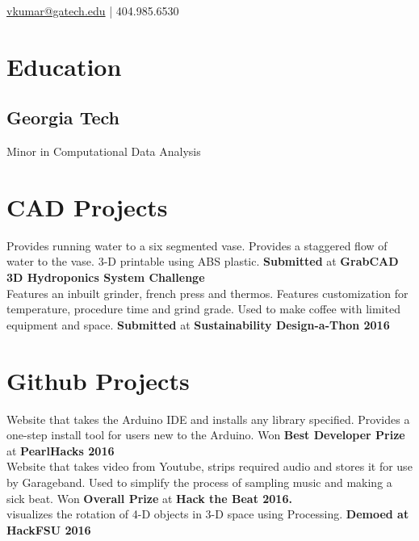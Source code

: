 \documentclass[a4paper]{deedy-resume}
\begin{document}

\href{vkumar@gatech.edu}{vkumar@gatech.edu} | 404.985.6530  

\begin{minipage}[t]{0.35\textwidth} 

\section{Education} 
\subsection{Georgia Tech}
Minor in Computational Data Analysis
\sectionspace 
\section{CAD Projects} 
    Provides running water to a six segmented vase. Provides a staggered flow of water to the vase. 3-D printable using ABS plastic. {\bf Submitted} at {\bf GrabCAD 3D Hydroponics System Challenge}\\ 
   Features an inbuilt grinder, french press and thermos. Features customization for temperature, procedure time and grind grade. Used to make coffee with limited equipment and space. {\bf Submitted} at {\bf Sustainability Design-a-Thon 2016}
\section{Github Projects} 
  \href{https://github.com/vishakhkumar/arduinoLibrary}{}  Website that takes the Arduino IDE and installs any library specified. Provides a one-step install tool for users new to the Arduino. Won {\bf Best Developer Prize} at {\bf PearlHacks 2016}\\
  \href{https://github.com/vishakhkumar/RIP}{}  Website that takes video from Youtube, strips required audio and stores it for use by Garageband. Used to simplify the process of sampling music and making a sick beat. Won {\bf Overall Prize} at {\bf Hack the Beat 2016.}\\ 
  
  \href{https://github.com/vishakhkumar/HyperPlane}{} visualizes the rotation of 4-D objects in 3-D space using Processing. {\bf Demoed at HackFSU 2016}\\ 
  

\end{minipage}
\end{document}
